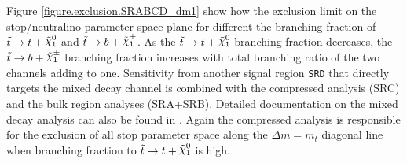 \indent Figure \ref{figure.exclusion.SRABCD_dm1} show how the exclusion limit on the stop/neutralino parameter space plane for different the branching fraction of $\stop \rightarrow t+\ninoone$ and $\stop \rightarrow b+\chinoonepm$.  As the $\stop \rightarrow t+\ninoone$ branching fraction decreases, the $\stop \rightarrow b+\chinoonepm$ branching fraction increases with total branching ratio of the two channels adding to one.  Sensitivity from another signal region {\tt SRD} that directly targets the mixed decay channel is combined with the compressed analysis (SRC) and the bulk region analyses (SRA+SRB).  Detailed documentation on the mixed decay analysis can also be found in \cite{stop0Lmoriond}.  Again the compressed analysis is responsible for the exclusion of all stop parameter space along the $\Delta m = m_{t}$ diagonal line when branching fraction to $\stop \rightarrow t+\ninoone$ is high. \\


